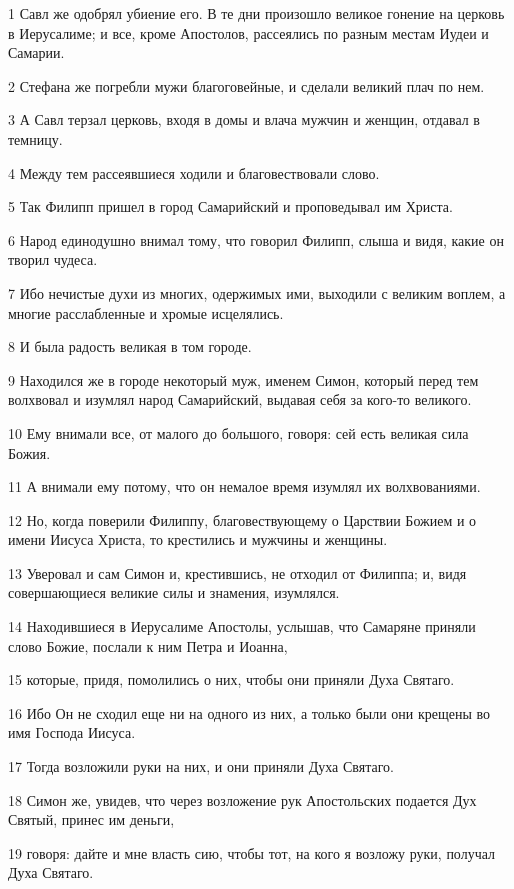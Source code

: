 \par 1 Савл же одобрял убиение его. В те дни произошло великое гонение на церковь в Иерусалиме; и все, кроме Апостолов, рассеялись по разным местам Иудеи и Самарии.
\par 2 Стефана же погребли мужи благоговейные, и сделали великий плач по нем.
\par 3 А Савл терзал церковь, входя в домы и влача мужчин и женщин, отдавал в темницу.
\par 4 Между тем рассеявшиеся ходили и благовествовали слово.
\par 5 Так Филипп пришел в город Самарийский и проповедывал им Христа.
\par 6 Народ единодушно внимал тому, что говорил Филипп, слыша и видя, какие он творил чудеса.
\par 7 Ибо нечистые духи из многих, одержимых ими, выходили с великим воплем, а многие расслабленные и хромые исцелялись.
\par 8 И была радость великая в том городе.
\par 9 Находился же в городе некоторый муж, именем Симон, который перед тем волхвовал и изумлял народ Самарийский, выдавая себя за кого-то великого.
\par 10 Ему внимали все, от малого до большого, говоря: сей есть великая сила Божия.
\par 11 А внимали ему потому, что он немалое время изумлял их волхвованиями.
\par 12 Но, когда поверили Филиппу, благовествующему о Царствии Божием и о имени Иисуса Христа, то крестились и мужчины и женщины.
\par 13 Уверовал и сам Симон и, крестившись, не отходил от Филиппа; и, видя совершающиеся великие силы и знамения, изумлялся.
\par 14 Находившиеся в Иерусалиме Апостолы, услышав, что Самаряне приняли слово Божие, послали к ним Петра и Иоанна,
\par 15 которые, придя, помолились о них, чтобы они приняли Духа Святаго.
\par 16 Ибо Он не сходил еще ни на одного из них, а только были они крещены во имя Господа Иисуса.
\par 17 Тогда возложили руки на них, и они приняли Духа Святаго.
\par 18 Симон же, увидев, что через возложение рук Апостольских подается Дух Святый, принес им деньги,
\par 19 говоря: дайте и мне власть сию, чтобы тот, на кого я возложу руки, получал Духа Святаго.
